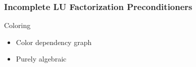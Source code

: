 \begin{frame}[fragile]
\frametitle{Incomplete LU Factorization Preconditioners}

     \begin{block}{Coloring}
      \begin{itemize}
        \item Color dependency graph
        \item Purely algebraic
      \end{itemize}

      \begin{center}
      \end{center}

    \end{block}
\end{frame}


